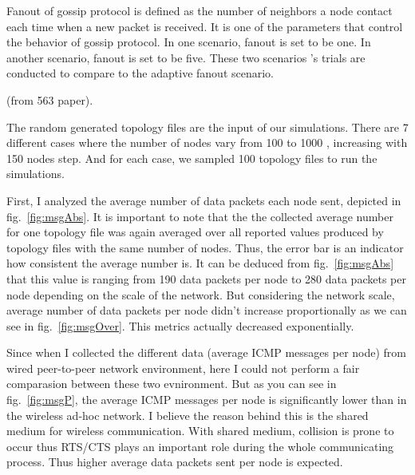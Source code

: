 Fanout of gossip protocol is defined as the number of neighbors a node contact each time when a new packet is received. It is one of the parameters that control the behavior of gossip protocol. In one scenario, fanout is set to be one. In another scenario, fanout is set to be five. These two scenarios 's trials are conducted to compare to the adaptive fanout scenario. 

(from 563 paper).

The random generated topology files are the input of our simulations. There are 7 different cases where the number of nodes vary from 100 to 1000 , increasing with 150 nodes step. And for each case, we sampled 100 topology files to run the simulations.

First, I analyzed the average number of data packets each node sent, depicted in fig.~\ref{fig:msgAbs}. It is important to note that the the collected average number for one topology file was again averaged over all reported values produced by topology files with the same number of nodes. Thus, the error bar is an indicator how consistent the average number is. It can be deduced from fig.~\ref{fig:msgAbs} that this value is ranging from 190 data packets per node to 280 data packets per node depending on the scale of the network. But considering the network scale, average number of data packets per node didn't increase proportionally as we can see in fig.~\ref{fig:msgOver}. This metrics actually decreased exponentially. 

%
%

Since when I collected the different data (average ICMP messages per node) from wired peer-to-peer network environment, here I could not perform a fair comparasion between these two evnironment. But as you can see in fig.~\ref{fig:msgP}, the average ICMP messages per node is significantly lower than in the wireless ad-hoc network. I believe the reason behind this is the shared medium for wireless communication. With shared medium, collision is prone to occur thus RTS/CTS plays an important role during the whole communicating process. Thus higher average data packets sent per node is expected.


